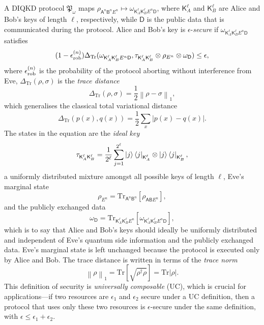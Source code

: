 \documentclass[10pt, a4paper]{article}
\numberwithin{equation}{section} %
\theoremstyle{definition}
\theoremstyle{plain}
\newcommand{\norm}[1]{\left\lVert#1\right\rVert}
\newcommand{\abs}[1]{\left\lvert#1\right\rvert}
\newcommand{\?}{\mathrel{?}} %
\newcommand{\Tr}{\mathrm{Tr}} %
\newcommand{\crv}[1]{\mathsf{#1}}
\newcommand{\rob}{\rm rob}
\newcommand{\erob}[1]{\epsilon_{\rob}^{(#1)}}
\begin{document}
    A DIQKD protocol \(\mathfrak{P}_{\omega}\) maps \(\rho_{\crv{A}^n \crv{B}^n E^n} \mapsto \omega_{\crv{K}_{A}^{\ell} \crv{K}_{B}^{\ell} E^n \crv{D}}\), where \(\crv{K}_{A}^{\ell}\) and \(\crv{K}_{B}^{\ell}\) are Alice and Bob's keys of length \(\ell\), respectively, while \(\crv{D}\) is the public data that is communicated during the protocol. Alice and Bob's key is \(\epsilon\)-\emph{secure} if \(\omega_{\crv{K}_{A}^{\ell} \crv{K}_{B}^{\ell} E^n \crv{D}}\) satisfies~\cite{SecurityQKD}
    \begin{equation}
      (1-\erob{n})\Delta_{\Tr}(\omega_{\crv{K}_{A}^{\ell} \crv{K}_{B}^{\ell} E^n \crv{D}}, \tau_{\crv{K}_{A}^{\ell} \crv{K}_{B}^{\ell}} \otimes \rho_{E^n} \otimes \omega_{\crv{D}}) \leq \epsilon,
    \end{equation}
    where \(\erob{n}\) is the probability of the protocol aborting without interference from Eve, \(\Delta_{\Tr}(\rho,\sigma)\) is the \emph{trace distance}
    \begin{equation}
      \Delta_{\Tr}(\rho, \sigma) = \frac{1}{2}\norm{\rho - \sigma}_1,
    \end{equation}
    which generalises the classical total variational distance
    \[ \Delta_{\Tr}(p(x),q(x)) = \frac{1}{2} \sum_{x} \abs{p(x)-q(x)}. \]
    The states in the equation are the \emph{ideal key}
    \begin{equation}
      \tau_{\crv{K}_{A}^{\ell} \crv{K}_{B}^{\ell}} = \frac{1}{2^{\ell}} \sum_{j=1}^{2^{\ell}} \ket{j}\bra{j}_{\crv{K}_{A}^{\ell}} \otimes \ket{j}\bra{j}_{\crv{K}_{B}^{\ell}},
    \end{equation}
    a uniformly distributed mixture amongst all possible keys of length \(\ell\), Eve's marginal state
    \begin{equation}
      \rho_{E^n} = \Tr_{\crv{A}^n \crv{B}^n}\left[ \rho_{\crv{A} \crv{B} E^n} \right],
    \end{equation}
    and the publicly exchanged data
    \begin{equation}
      \omega_{\crv{D}} = \Tr_{\crv{K}_{A}^{\ell} \crv{K}_{B}^{\ell} E^n}\left[ \omega_{\crv{K}_{A}^{\ell} \crv{K}_{B}^{\ell} E^n \crv{D}} \right],
    \end{equation} 
    which is to say that Alice and Bob's keys should ideally be uniformly distributed and independent of Eve's quantum side information and the publicly exchanged data. Eve's marginal state is left unchanged because the protocol is executed only by Alice and Bob. The trace distance is written in terms of the \emph{trace norm}
    \begin{equation}
      \norm{\rho}_1 = \Tr\left[ \sqrt{\rho^{\dagger}\rho} \right] = \Tr\abs{\rho}.
    \end{equation}
    This definition of security is \emph{universally composable} (UC), which is crucial for applications---if two resources are \(\epsilon_1\) and \(\epsilon_2\) secure under a UC definition, then a protocol that uses only these two resources is \(\epsilon\)-secure under the same definition, with \(\epsilon \leq \epsilon_1 + \epsilon_2\).
\end{document}
